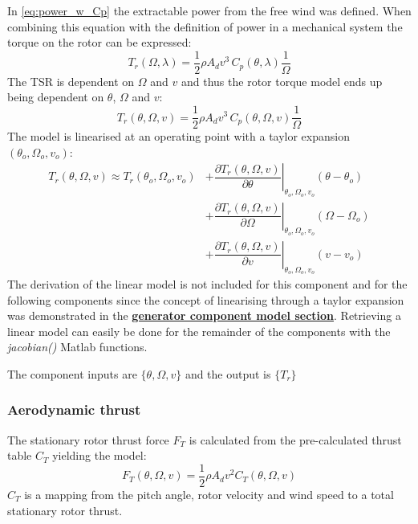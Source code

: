 In \cref{eq:power_w_Cp} the extractable power from the free wind was defined. When combining this equation with the definition of power in a mechanical system the torque on the rotor can be expressed:
\begin{equation}\label{eq:comp_Mrot_lambda}
	T_r(\Omega, \lambda) = \dfrac{1}{2} \rho A_d v^3 \, C_p(\theta, \lambda) \dfrac{1}{\Omega}
\end{equation}
The TSR is dependent on $ \Omega $ and $ v $ and thus the rotor torque model ends up being dependent on $ \theta $, $ \Omega $ and $ v $:
\begin{equation}\label{eq:comp_Mrot_wind}
	T_r(\theta, \Omega, v) = \dfrac{1}{2} \rho A_d v^3 \, C_p(\theta, \Omega, v) \dfrac{1}{\Omega}
\end{equation}
The model is linearised at an operating point with a taylor expansion $ (\theta_o, \Omega_o, v_o) $:
\begin{align}
	T_r(\theta, \Omega, v) \approx T_r(\theta_o, \Omega_o, v_o) 
	& + \left. \dfrac{\partial T_r(\theta, \Omega, v)}{\partial \theta} \right |_{\theta_o, \Omega_o, v_o} ( \theta-\theta_o) \\
	& + \left. \dfrac{\partial T_r(\theta, \Omega, v)}{\partial \Omega} \right |_{\theta_o, \Omega_o, v_o} ( \Omega-\Omega_o) \\
	& + \left. \dfrac{\partial T_r(\theta, \Omega, v)}{\partial v} \right |_{\theta_o, \Omega_o, v_o} ( v - v_o)
\end{align}
The derivation of the linear model is not included for this component and for the following components since the concept of linearising through a taylor expansion was demonstrated in the \hyperref[sec:comp_generator]{\textbf{generator component model section}}. Retrieving a linear model can easily be done for the remainder of the components with the \textit{jacobian()} Matlab functions.

The component inputs are $ \{\theta, \Omega, v\} $ and the output is $ \{T_r\} $

\subsubsection{Aerodynamic thrust} \label{sec:comp_aero_thrust}
The stationary rotor thrust force $ F_T $ is calculated from the pre-calculated thrust table $ C_T $ yielding the model:
\begin{equation} \label{eq:comp_aero_thrust}
	F_T(\theta, \Omega, v) = \dfrac{1}{2} \rho A_d v^2 C_T(\theta, \Omega, v)
\end{equation}
$ C_T $ is a mapping from the pitch angle, rotor velocity and wind speed to a total stationary rotor thrust.

